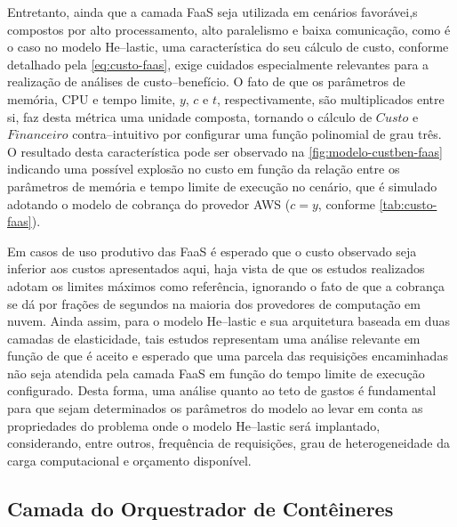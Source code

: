\documentclass[english,brazilian]{UNISINOSmonografia} %
\begin{document}
Entretanto, ainda que a camada FaaS seja utilizada em cenários favorávei,s compostos por alto processamento, alto paralelismo e baixa comunicação, como é o caso no modelo \textsf{He}--lastic, uma característica do seu cálculo de custo, conforme detalhado pela \autoref{eq:custo-faas}, exige cuidados especialmente relevantes para a realização de análises de custo--benefício.
O fato de que os parâmetros de memória, CPU e tempo limite, $y$, $c$ e $t$, respectivamente, são multiplicados entre si, faz desta métrica uma unidade composta, tornando o cálculo de $ Custo $ e $ Financeiro $ contra--intuitivo por configurar uma função polinomial de grau três.
O resultado desta característica pode ser observado na \autoref{fig:modelo-custben-faas} indicando uma possível explosão no custo em função da relação entre os parâmetros de memória e tempo limite de execução no cenário, que é simulado adotando o modelo de cobrança do provedor AWS ($ c = y $, conforme \autoref{tab:custo-faas}).



Em casos de uso produtivo das FaaS é esperado que o custo observado seja inferior aos custos apresentados aqui, haja vista de que os estudos realizados adotam os limites máximos como referência, ignorando o fato de que a cobrança se dá por frações de segundos na maioria dos provedores de computação em nuvem.
Ainda assim, para o modelo \textsf{He}--lastic e sua arquitetura baseada em duas camadas de elasticidade, tais estudos representam uma análise relevante em função de que é aceito e esperado que uma parcela das requisições encaminhadas não seja atendida pela camada FaaS em função do tempo limite de execução configurado.
Desta forma, uma análise quanto ao teto de gastos é fundamental para que sejam determinados os parâmetros do modelo ao levar em conta as propriedades do problema onde o modelo \textsf{He}--lastic será implantado, considerando, entre outros, frequência de requisições, grau de heterogeneidade da carga computacional e orçamento disponível.






\subsection{Camada do Orquestrador de Contêineres}
\end{document}
